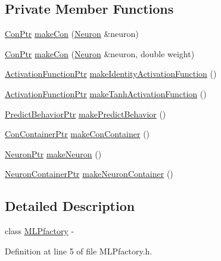 \subsection*{Private Member Functions}
\begin{DoxyCompactItemize}
\item 
\hyperlink{_a_m_o_r_e_8h_a169bb8e5f26ce70bf2b10dec2fb5ee50}{ConPtr} \hyperlink{class_m_l_pfactory_a3df7c74068372a88ec529d8844938d88}{makeCon} (\hyperlink{class_neuron}{Neuron} \&neuron)
\item 
\hyperlink{_a_m_o_r_e_8h_a169bb8e5f26ce70bf2b10dec2fb5ee50}{ConPtr} \hyperlink{class_m_l_pfactory_ac47beb4aced10b9c99414ba7dd7c8b55}{makeCon} (\hyperlink{class_neuron}{Neuron} \&neuron, double weight)
\item 
\hyperlink{_a_m_o_r_e_8h_a77602a0277a02e5769c3df0adc669b17}{ActivationFunctionPtr} \hyperlink{class_m_l_pfactory_a2e0323210a1a086a8a646b060d4db1b3}{makeIdentityActivationFunction} ()
\item 
\hyperlink{_a_m_o_r_e_8h_a77602a0277a02e5769c3df0adc669b17}{ActivationFunctionPtr} \hyperlink{class_m_l_pfactory_a8744ff60b65b6b9d37f25d9f3fdb3cfd}{makeTanhActivationFunction} ()
\item 
\hyperlink{_a_m_o_r_e_8h_a1fb2f1f8fdf1e08c42ef4bdce436af93}{PredictBehaviorPtr} \hyperlink{class_m_l_pfactory_aba55f8dff50e23de43170ccbfffa4f89}{makePredictBehavior} ()
\item 
\hyperlink{_a_m_o_r_e_8h_a1021dbaf961d1c8da6d58a8566e5778b}{ConContainerPtr} \hyperlink{class_m_l_pfactory_a69562b8fd06c60a2d5db66d8b0f10299}{makeConContainer} ()
\item 
\hyperlink{_a_m_o_r_e_8h_ac1ea936c2c7728eb382278131652fef4}{NeuronPtr} \hyperlink{class_m_l_pfactory_a7bb87e6e5427385b02041f2c36d1c8fb}{makeNeuron} ()
\item 
\hyperlink{_a_m_o_r_e_8h_a6157c259718f98f808c85d7f77048970}{NeuronContainerPtr} \hyperlink{class_m_l_pfactory_a174caa9d45bc964a07d86f6221e576e1}{makeNeuronContainer} ()
\end{DoxyCompactItemize}


\subsection{Detailed Description}
class \hyperlink{class_m_l_pfactory}{MLPfactory} -\/ 

Definition at line 5 of file MLPfactory.h.



